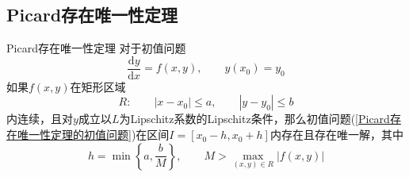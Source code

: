 \documentclass[lang = cn, scheme = chinese, thmcnt = section]{elegantbook}
\newcommand{\dd}{\mathrm{d}}           %
\begin{document}
\subsection{Picard存在唯一性定理}

\begin{theorem}{Picard存在唯一性定理}
	对于初值问题
	\begin{equation*}
		\frac{\dd y}{\dd x}=f(x,y),\qquad 
		y(x_0)=y_0
		\label{Picard存在唯一性定理的初值问题}
		\tag{1}
	\end{equation*}
	如果$f(x,y)$在矩形区域
	$$
	R:\qquad 
	|x-x_0|\le a,\qquad 
	|y-y_0|\le b
	$$
	内连续，且对$y$成立以$L$为Lipschitz系数的Lipschitz条件，那么初值问题(\ref{Picard存在唯一性定理的初值问题})在区间$I=[x_0-h,x_0+h]$内存在且存在唯一解，其中
	$$
	h=\min{\left\{a,\frac{b}{M}\right\}},\qquad 
	M>\max_{(x,y)\in{R}}{|f(x,y)|}
	$$
\end{theorem}
\end{document}
